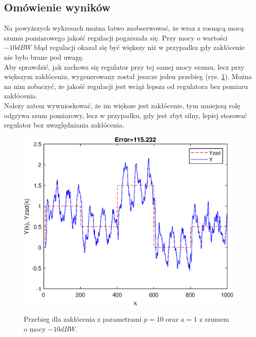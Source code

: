 \subsection{Omówienie wyników}
Na powyższych wykresach można łatwo zaobserwować, że wraz z rosnącą mocą szumu pomiarowego jakość regulacji pogarszała się. Przy mocy o wartości $-10 dBW$ błąd regulacji okazał się być większy niż w przypadku gdy zakłócenie nie było brane pod uwagę. \\
Aby sprawdzić, jak zachowa się regulator przy tej samej mocy szumu, lecz przy większym zakłóceniu, wygenerowany został jeszcze jeden przebieg (rys. \ref{fig:szum1-10}). Można na nim zobaczyć, że jakość regulacji jest wciąż lepsza od regulatora bez pomiaru zakłócenia. \\
Należy zatem wywnioskować, że im większe jest zakłócenie, tym mniejszą rolę odgrywa szum pomiarowy, lecz w przypadku, gdy jest zbyt silny, lepiej stosować regulator bez uwzględniania zakłócenia.
\begin{figure}[h!]
	\centering
	\includegraphics[scale=1]{Rys/szum1-10}
	\label{fig:szum1-10}
	\caption{Przebieg dla zakłócenia z parametrami $p=10$ oraz $a=1$ z szumem o mocy $-10 dBW$.}
\end{figure}
